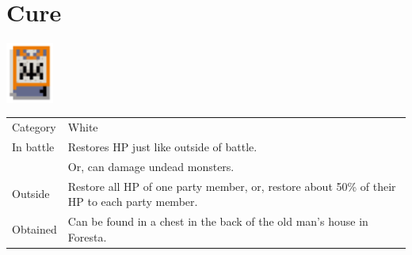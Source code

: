 \section{Cure}
\label{spell:cure}

\includegraphics[height=2cm,keepaspectratio]{./resources/spells/cure}

\begin{longtable}{ l p{9cm} }
	Category
	& White
\\ %
	In battle
	& Restores HP just like outside of battle. \\ 
	& Or, can damage undead monsters.
\\ %
	Outside
	& Restore all HP of one party member, or, restore about 50\% of their HP to each party member.
\\ %
	Obtained
	& Can be found in a chest in the back of the old man’s house in Foresta.
\end{longtable}
